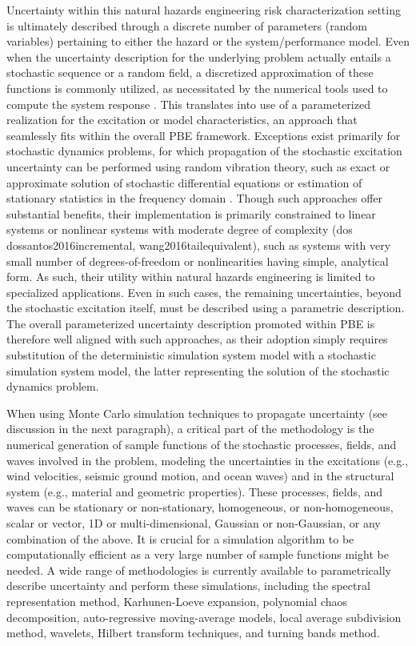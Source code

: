 Uncertainty within this natural hazards engineering risk characterization setting is ultimately described through a discrete number of parameters (random variables) pertaining to either the hazard or the system/performance model. Even when the uncertainty description for the underlying problem actually entails a stochastic sequence or a random field, a discretized approximation of these functions is commonly utilized, as necessitated by the numerical tools used to compute the system response \citep{gidaris2014surrogate}. This translates into use of a parameterized realization for the excitation or model characteristics, an approach that seamlessly fits within the overall PBE framework. Exceptions exist primarily for stochastic dynamics problems, for which propagation of the stochastic excitation uncertainty can be performed using random vibration theory, such as exact or approximate solution of stochastic differential equations or estimation of stationary statistics in the frequency domain \citep{li2009stochastic}. Though such approaches offer substantial benefits, their implementation is primarily constrained to linear systems or nonlinear systems with moderate degree of complexity (dos dossantos2016incremental, wang2016tailequivalent), such as systems with very small number of degrees-of-freedom or nonlinearities having simple, analytical form. As such, their utility within natural hazards engineering is limited to specialized applications. Even in such cases, the remaining uncertainties, beyond the stochastic excitation itself, must be described using a parametric description. The overall parameterized uncertainty description promoted within PBE is therefore well aligned with such approaches, as their adoption simply requires substitution of the deterministic simulation system model with a stochastic simulation system model, the latter representing the solution of the stochastic dynamics problem.

When using Monte Carlo simulation techniques to propagate uncertainty (see discussion in the next paragraph), a critical part of the methodology is the numerical generation of sample functions of the stochastic processes, fields, and waves involved in the problem, modeling the uncertainties in the excitations (e.g., wind velocities, seismic ground motion, and ocean waves) and in the structural system (e.g., material and geometric properties). These processes, fields, and waves can be stationary or non-stationary, homogeneous, or non-homogeneous, scalar or vector, 1D or multi-dimensional, Gaussian or non-Gaussian, or any combination of the above. It is crucial for a simulation algorithm to be computationally efficient as a very large number of sample functions might be needed. A wide range of methodologies is currently available to parametrically describe uncertainty and perform these simulations, including the spectral representation method, Karhunen-Loeve expansion, polynomial chaos decomposition, auto-regressive moving-average models, local average subdivision method, wavelets, Hilbert transform techniques, and turning bands method.

